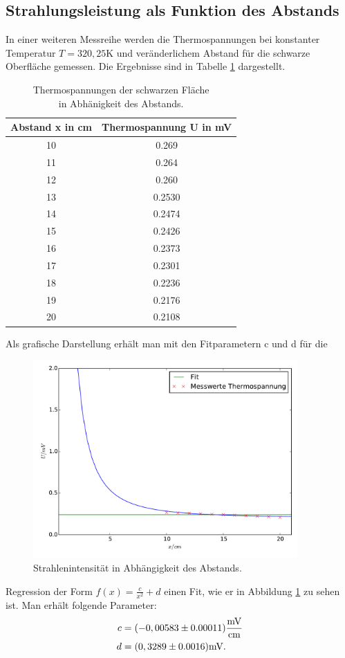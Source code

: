 \subsection{Strahlungsleistung als Funktion des Abstands}
In einer weiteren Messreihe werden die Thermospannungen bei konstanter Temperatur
$T=320,25\si{\kelvin}$ und veränderlichem Abstand für die schwarze Oberfläche
gemessen. Die Ergebnisse sind in Tabelle \ref{tab:thermospannung2} dargestellt.
\begin{table}
  \centering
  \begin{tabular}{c c}
    \toprule
    Abstand x in cm & Thermospannung U in \si{\milli\volt}\\
    \midrule
    10 & 0.269  \\
    11 & 0.264  \\
    12 & 0.260  \\
    13 & 0.2530 \\
    14 & 0.2474 \\
    15 & 0.2426 \\
    16 & 0.2373 \\
    17 & 0.2301 \\
    18 & 0.2236 \\
    19 & 0.2176 \\
    20 & 0.2108 \\
    \bottomrule
  \end{tabular}
 \caption{Thermospannungen der schwarzen Fläche\\in Abhänigkeit des Abstands.}
 \label{tab:thermospannung2}
\end{table}
\newpage
Als grafische Darstellung erhält man mit den Fitparametern c und d für die
\begin{figure}
  \centering
  \includegraphics[width=0.9\textwidth]{strahlintensitaet.pdf}
  \caption{Strahlenintensität in Abhängigkeit des Abstands.}
  \label{fig:strahlintensitaet}
\end{figure}
Regression der Form $f(x) = \frac{c}{x^2} + d $ einen Fit, wie er in Abbildung
\ref{fig:strahlintensitaet} zu sehen ist. Man erhält folgende Parameter:
\begin{align*}
  c &= (-0,00583\pm0.00011) \si{\frac{\milli\volt}{\centi\meter}} \\
  d &= (0,3289\pm0.0016) \si{\milli\volt}.
\end{align*}

